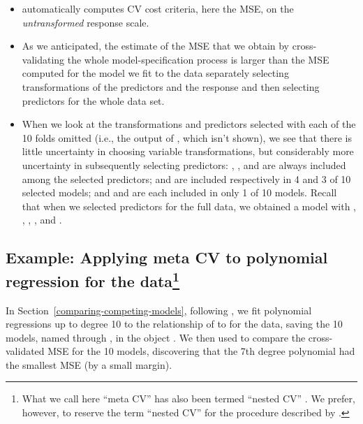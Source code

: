 \documentclass[
]{jss}
\providecommand{\tightlist}{%
  \setlength{\itemsep}{0pt}\setlength{\parskip}{0pt}}
\begin{document}
\begin{itemize}
\tightlist
\item
   automatically computes CV cost criteria,
  here the MSE, on the \emph{untransformed} response scale.
\item
  As we anticipated, the estimate of the MSE that we obtain by
  cross-validating the whole model-specification process is larger than
  the MSE computed for the model we fit to the  data
  separately selecting transformations of the predictors and the
  response and then selecting predictors for the whole data set.
\item
  When we look at the transformations and predictors selected with each
  of the 10 folds omitted (i.e., the output of ,
  which isn't shown), we see that there is little uncertainty in
  choosing variable transformations, but considerably more uncertainty
  in subsequently selecting predictors: ,
  , and  are always included among the selected
  predictors;  and  are included
  respectively in 4 and 3 of 10 selected models; and 
  and  are each included in only 1 of 10 models. Recall
  that when we selected predictors for the full data, we obtained a
  model with , , ,
  , and .
\end{itemize}

\subsection[Example: Applying meta CV to polynomial regression for the
Auto data]{\texorpdfstring{Example: Applying meta CV to polynomial
regression for the 
data\footnote{What we call here ``meta CV'' has also been termed
  ``nested CV'' \citep[e.g., in the  package
  by][]{OlsenZachariae:2024}. We prefer, however, to reserve the term
  ``nested CV'' for the procedure described by
  \citet{BatesHastieTibshirani:2023}.}}{Example: Applying meta CV to polynomial regression for the Auto data}}\label{example-applying-meta-cv-to-polynomial-regression-for-the-auto-datameta-cv}

In Section~\ref{comparing-competing-models}, following \citet[Secs. 5.1,
5.3]{JamesEtAl:2021}, we fit polynomial regressions up to degree 10 to
the relationship of  to  for the 
data, saving the 10 models, named  through , in the
object . We then used  to compare the
cross-validated MSE for the 10 models, discovering that the 7th degree
polynomial had the smallest MSE (by a small margin).
\end{document}
